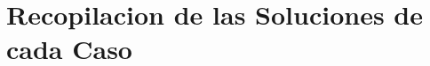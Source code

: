 \section{Recopilacion de las Soluciones de cada Caso} \label{Anexo:recopilacion-soluciones-por-fases}
